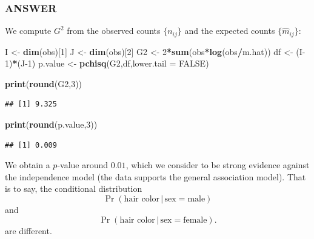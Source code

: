 \documentclass[
]{article}
\newenvironment{Shaded}{\begin{snugshade}}{\end{snugshade}}
\newcommand{\AttributeTok}[1]{\textcolor[rgb]{0.13,0.29,0.53}{#1}}
\newcommand{\ConstantTok}[1]{\textcolor[rgb]{0.56,0.35,0.01}{#1}}
\newcommand{\DecValTok}[1]{\textcolor[rgb]{0.00,0.00,0.81}{#1}}
\newcommand{\FunctionTok}[1]{\textcolor[rgb]{0.13,0.29,0.53}{\textbf{#1}}}
\newcommand{\NormalTok}[1]{#1}
\newcommand{\OtherTok}[1]{\textcolor[rgb]{0.56,0.35,0.01}{#1}}
\newcommand{\SpecialCharTok}[1]{\textcolor[rgb]{0.81,0.36,0.00}{\textbf{#1}}}
\begin{document}
\hypertarget{answer-15}{%
\subsubsection{ANSWER}\label{answer-15}}

We compute \(G^2\) from the observed counts \(\{n_{i j}\}\) and the
expected counts \(\{\hat{m}_{i j}\}\):

\begin{Shaded}
\begin{Highlighting}[]
\NormalTok{I }\OtherTok{\textless{}{-}} \FunctionTok{dim}\NormalTok{(obs)[}\DecValTok{1}\NormalTok{]}
\NormalTok{J }\OtherTok{\textless{}{-}} \FunctionTok{dim}\NormalTok{(obs)[}\DecValTok{2}\NormalTok{]}
\NormalTok{G2 }\OtherTok{\textless{}{-}} \DecValTok{2}\SpecialCharTok{*}\FunctionTok{sum}\NormalTok{(obs}\SpecialCharTok{*}\FunctionTok{log}\NormalTok{(obs}\SpecialCharTok{/}\NormalTok{m.hat))}
\NormalTok{df }\OtherTok{\textless{}{-}}\NormalTok{ (I}\DecValTok{{-}1}\NormalTok{)}\SpecialCharTok{*}\NormalTok{(J}\DecValTok{{-}1}\NormalTok{)}
\NormalTok{p.value }\OtherTok{\textless{}{-}} \FunctionTok{pchisq}\NormalTok{(G2,df,}\AttributeTok{lower.tail =} \ConstantTok{FALSE}\NormalTok{)}

\FunctionTok{print}\NormalTok{(}\FunctionTok{round}\NormalTok{(G2,}\DecValTok{3}\NormalTok{))}
\end{Highlighting}
\end{Shaded}

\begin{verbatim}
## [1] 9.325
\end{verbatim}

\begin{Shaded}
\begin{Highlighting}[]
\FunctionTok{print}\NormalTok{(}\FunctionTok{round}\NormalTok{(p.value,}\DecValTok{3}\NormalTok{))}
\end{Highlighting}
\end{Shaded}

\begin{verbatim}
## [1] 0.009
\end{verbatim}

We obtain a \(p\)-value around \(0.01\), which we consider to be strong
evidence against the independence model (the data supports the general
association model). That is to say, the conditional distribution \[
  \Pr(\text{hair color} \,|\, \text{sex} = \text{male})
\] and \[
  \Pr(\text{hair color} \,|\, \text{sex} = \text{female}).
\] are different.
\end{document}

